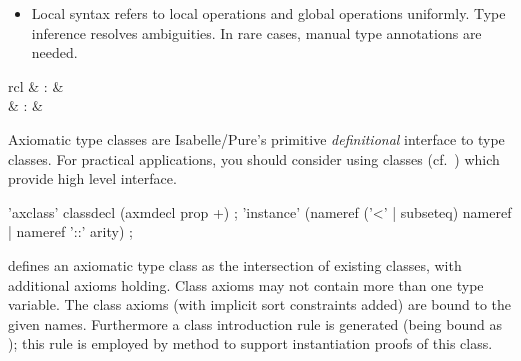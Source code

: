 \begin{isabellebody}
\begin{isamarkuptext}
\begin{itemize}
  \item Local syntax refers to local operations  and
  global operations  uniformly.  Type inference
  resolves ambiguities.  In rare cases, manual type annotations are
  needed.
  
  \end{itemize}%
\end{isamarkuptext}%
\isamarkuptrue%
%
\isamarkuptrue%
%
\begin{isamarkuptext}%
\begin{matharray}{rcl}
    \mbox{} & : &  \\
    \mbox{} & : &  \\
  \end{matharray}

  Axiomatic type classes are Isabelle/Pure's primitive
  \emph{definitional} interface to type classes.  For practical
  applications, you should consider using classes
  (cf.~) which provide high level interface.

  \begin{rail}
    'axclass' classdecl (axmdecl prop +)
    ;
    'instance' (nameref ('<' | subseteq) nameref | nameref '::' arity)
    ;
  \end{rail}

  \begin{descr}
  
  \item [\mbox{\isa{\isacommand{axclass}}}~\isa{{\isachardoublequote}c\ {\isasymsubseteq}\ c\isactrlsub {\isadigit{1}}{\isacharcomma}\ {\isasymdots}{\isacharcomma}\ c\isactrlsub n\ axms{\isachardoublequote}}] defines an axiomatic type class as the intersection of
  existing classes, with additional axioms holding.  Class axioms may
  not contain more than one type variable.  The class axioms (with
  implicit sort constraints added) are bound to the given names.
  Furthermore a class introduction rule is generated (being bound as
  ); this rule is employed by method \mbox{} to support instantiation proofs of this class.
  

\end{descr}
\end{isamarkuptext}
\end{isabellebody}
